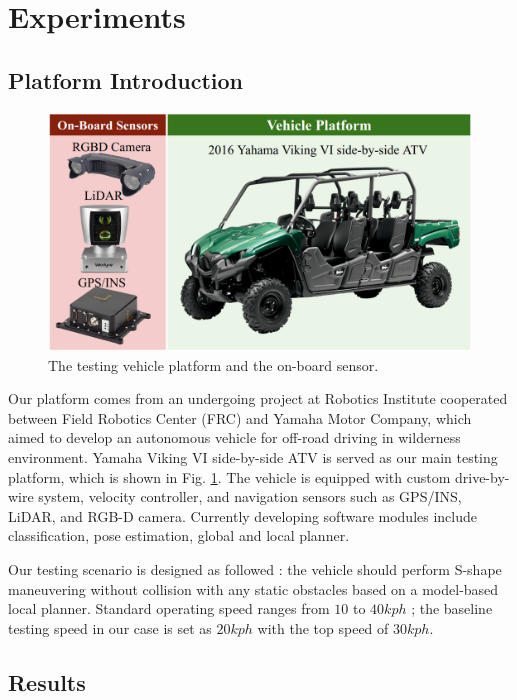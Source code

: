 \documentclass[../thesis.tex]{subfiles}
\begin{document}
\section{Experiments}

\subsection{Platform Introduction}

\begin{figure}[t]
	\begin{center}
		\centerline{\includegraphics[width=0.8\columnwidth]{./RRTPlanner/fig/viking.png}}
		\caption{The testing vehicle platform and the on-board sensor.}
		\label{fig:viking}
	\end{center}
\end{figure} 

Our platform comes from an undergoing project at Robotics Institute cooperated between Field Robotics Center (FRC) and Yamaha Motor Company, which aimed to develop an autonomous vehicle for off-road driving in wilderness environment. Yamaha Viking VI side-by-side ATV is served as our main testing platform, which is shown in Fig. \ref{fig:viking}. The vehicle is equipped with custom drive-by-wire system, velocity controller, and navigation sensors such as GPS/INS, LiDAR, and RGB-D camera. Currently developing software modules include classification, pose estimation, global and local planner. 

Our testing scenario is designed as followed : the vehicle should perform S-shape maneuvering without collision with any static obstacles based on a model-based local planner. Standard operating speed ranges from $10$ to $40 kph$ ; the baseline testing speed in our case is set as $20 kph$ with the top speed of $30 kph$.


\subsection{Results}
\end{document}

